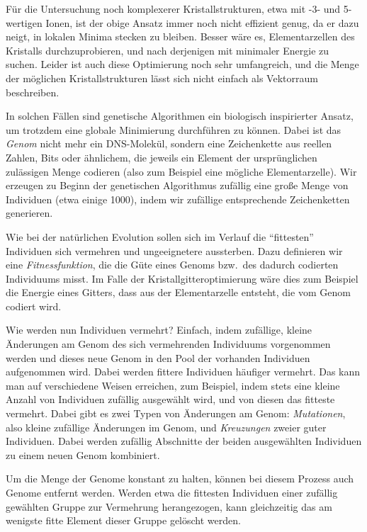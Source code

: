 Für die Untersuchung noch komplexerer Kristallstrukturen, etwa mit -3-
und 5-wertigen Ionen, ist der obige Ansatz immer noch nicht effizient
genug, da er dazu neigt, in lokalen Minima stecken zu bleiben. Besser
wäre es, Elementarzellen des Kristalls durchzuprobieren, und nach
derjenigen mit minimaler Energie zu suchen. Leider ist auch diese
Optimierung noch sehr umfangreich, und die Menge der möglichen
Kristallstrukturen lässt sich nicht einfach als Vektorraum beschreiben.

In solchen Fällen sind genetische Algorithmen ein biologisch
inspirierter Ansatz, um trotzdem eine globale Minimierung durchführen
zu können. Dabei ist das \emph{Genom} nicht mehr ein DNS-Molekül,
sondern eine Zeichenkette aus reellen Zahlen, Bits oder ähnlichem, die
jeweils ein Element der ursprünglichen zulässigen Menge codieren (also
zum Beispiel eine mögliche Elementarzelle). Wir erzeugen zu Beginn der
genetischen Algorithmus zufällig eine große Menge von Individuen (etwa
einige 1000), indem wir zufällige entsprechende Zeichenketten
generieren.

Wie bei der natürlichen Evolution sollen sich im Verlauf die
"`fittesten"' Individuen sich vermehren und ungeeignetere aussterben.
Dazu definieren wir eine \emph{Fitnessfunktion}, die die Güte eines
Genoms bzw.\ des dadurch codierten Individuums misst. Im Falle der
Kristallgitteroptimierung wäre dies zum Beispiel die Energie eines
Gitters, dass aus der Elementarzelle entsteht, die vom Genom codiert
wird.

Wie werden nun Individuen vermehrt? Einfach, indem zufällige, kleine
Änderungen am Genom des sich vermehrenden Individuums vorgenommen
werden und dieses neue Genom in den Pool der vorhanden Individuen
aufgenommen wird. Dabei werden fittere Individuen häufiger
vermehrt. Das kann man auf verschiedene Weisen erreichen, zum
Beispiel, indem stets eine kleine Anzahl von Individuen zufällig
ausgewählt wird, und von diesen das fitteste vermehrt.  Dabei gibt es
zwei Typen von Änderungen am Genom: \emph{Mutationen}, also kleine
zufällige Änderungen im Genom, und \emph{Kreuzungen} zweier guter
Individuen. Dabei werden zufällig Abschnitte der beiden ausgewählten
Individuen zu einem neuen Genom kombiniert.

Um die Menge der Genome konstant zu halten, können bei diesem Prozess
auch Genome entfernt werden. Werden etwa die fittesten Individuen
einer zufällig gewählten Gruppe zur Vermehrung herangezogen, kann
gleichzeitig das am wenigste fitte Element dieser Gruppe gelöscht
werden.

